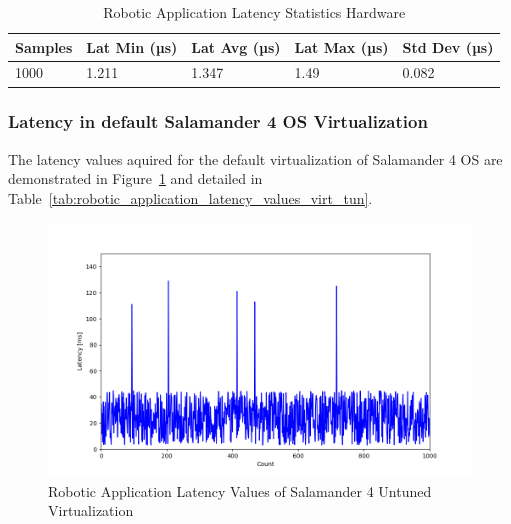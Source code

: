 \documentclass[MMR,Master,english]{twbook}
\begin{document}
\begin{table}[H]
	\centering
	\caption{Robotic Application Latency Statistics Hardware}
	\label{tab:robotic_application_latency_values_hardware}
	\setlength{\tabcolsep}{0.5em} %
	{\renewcommand{\arraystretch}{1.2}%
		\begin{tabular}{|l|l|l|l|l|}
			\hline
			\textbf{Samples} & \textbf{Lat Min (µs)} & \textbf{Lat Avg (µs)} & \textbf{Lat Max (µs)} & \textbf{Std Dev (µs)} \\ \hline

			1000             & 1.211                 & 1.347                  & 1.49                  & 0.082                   \\ \hline
		\end{tabular}}
\end{table}

\clearpage

\subsubsection{Latency in default Salamander 4 OS Virtualization}\label{subsubsec:latency_virtualization}
\noindent The latency values aquired for the default virtualization of Salamander 4 OS are demonstrated in Figure~\ref{fig:untuned_virt_latencies} and detailed in Table~\ref{tab:robotic_application_latency_values_virt_tun}. 

\begin{figure}[H]
	\centering
	\includegraphics[width=1.0\columnwidth]{masterthesis-documentation/docs/resources/scripts/experiment/generated_latencies/untuned_virt_latencies.png}
	\caption[Robotic Application Latency Values of Salamander 4 Untuned Virtualization]{Robotic Application Latency Values of Salamander 4 Untuned Virtualization}
	\label{fig:untuned_virt_latencies}
\end{figure}
\end{document}
